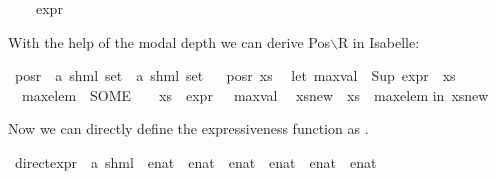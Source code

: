 \begin{isabellebody}
\ \ {}\ {\isacharplus}{\kern0pt}\ {\isacharparenleft}{\kern0pt}expr{\isacharunderscore}{\kern0pt}{}\ {\isasymphi}{\isacharparenright}{\kern0pt}{\isacartoucheclose}%
\begin{isamarkuptext}%
With the help of the modal depth we can derive Pos$\backslash$R in Isabelle:%
\end{isamarkuptext}\isamarkuptrue%
\isamarkupfalse%
\ pos{\isacharunderscore}{\kern0pt}r\ {\isacharcolon}{\kern0pt}{\isacharcolon}{\kern0pt}\ {\isachardoublequoteopen}{\isacharparenleft}{\kern0pt}{\isacharprime}{\kern0pt}a{\isacharcomma}{\kern0pt}\ {\isacharprime}{\kern0pt}s{\isacharparenright}{\kern0pt}hml\ set\ {\isasymRightarrow}\ {\isacharparenleft}{\kern0pt}{\isacharprime}{\kern0pt}a{\isacharcomma}{\kern0pt}\ {\isacharprime}{\kern0pt}s{\isacharparenright}{\kern0pt}hml\ set{\isachardoublequoteclose}\isanewline
\ \ \isanewline
{\isachardoublequoteopen}pos{\isacharunderscore}{\kern0pt}r\ xs\ {\isacharequal}{\kern0pt}\ {\isacharparenleft}{\kern0pt}\isanewline
let\ max{\isacharunderscore}{\kern0pt}val\ {\isacharequal}{\kern0pt}\ {\isacharparenleft}{\kern0pt}Sup\ {\isacharparenleft}{\kern0pt}expr{\isacharunderscore}{\kern0pt}{}\ {\isacharbackquote}{\kern0pt}\ xs{\isacharparenright}{\kern0pt}{\isacharparenright}{\kern0pt}{\isacharsemicolon}{\kern0pt}\ \isanewline
\ \ max{\isacharunderscore}{\kern0pt}elem\ {\isacharequal}{\kern0pt}\ {\isacharparenleft}{\kern0pt}SOME\ {\isasympsi}{\isachardot}{\kern0pt}\ {\isasympsi}\ {\isasymin}\ xs\ {\isasymand}\ expr{\isacharunderscore}{\kern0pt}{}\ {\isasympsi}\ {\isacharequal}{\kern0pt}\ max{\isacharunderscore}{\kern0pt}val{\isacharparenright}{\kern0pt}{\isacharsemicolon}{\kern0pt}\isanewline
\ \ xs{\isacharunderscore}{\kern0pt}new\ {\isacharequal}{\kern0pt}\ xs\ {\isacharminus}{\kern0pt}\ {\isacharbraceleft}{\kern0pt}max{\isacharunderscore}{\kern0pt}elem{\isacharbraceright}{\kern0pt}\isanewline
in\ xs{\isacharunderscore}{\kern0pt}new{\isacharparenright}{\kern0pt}{\isachardoublequoteclose}%
\begin{isamarkuptext}%
Now we can directly define the expressiveness function as .%
\end{isamarkuptext}\isamarkuptrue%
\isamarkupfalse%
\ direct{\isacharunderscore}{\kern0pt}expr\ {\isacharcolon}{\kern0pt}{\isacharcolon}{\kern0pt}\ {\isachardoublequoteopen}{\isacharparenleft}{\kern0pt}{\isacharprime}{\kern0pt}a{\isacharcomma}{\kern0pt}\ {\isacharprime}{\kern0pt}s{\isacharparenright}{\kern0pt}hml\ {\isasymRightarrow}\ enat\ {\isasymtimes}\ enat\ {\isasymtimes}\ enat\ {\isasymtimes}\ enat\ {\isasymtimes}\ enat\ {\isasymtimes}\ enat{\isachardoublequoteclose}\ \isanewline

\end{isabellebody}
